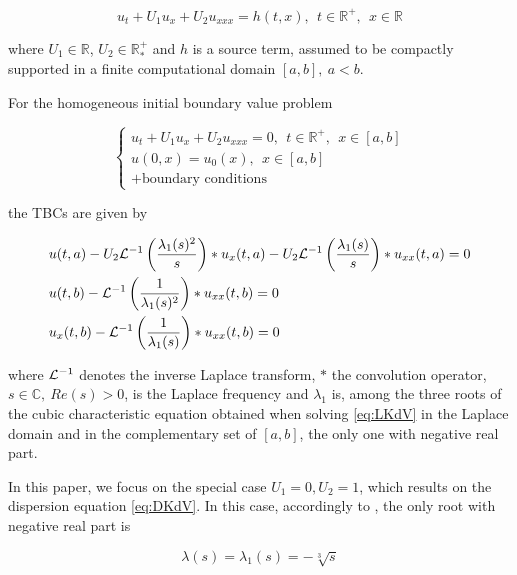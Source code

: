 \begin{equation}
 	\label{eq:LKdV}
 	u_t + U_1u_x + U_2u_{xxx} = h(t,x), \ \ t \in \mathbb{R}^+, \ \ x \in \mathbb{R}
\end{equation}

\noindent where $U_1 \in \mathbb{R}$, $U_2 \in \mathbb{R}^+_*$ and $h$ is a source term, assumed to be compactly supported in a finite computational domain $[a,b], \ a < b$.

\indent For the homogeneous initial boundary value problem 

\begin{equation*}
\begin{cases}
	u_t + U_1u_x + U_2u_{xxx} = 0, \ \ t \in \mathbb{R}^+, \ \ x \in [a,b] \\
	u(0,x) = u_0(x), \ \ x \in [a,b] \\
	+ \text{boundary conditions} \nonumber
\end{cases}
\end{equation*}

\noindent the TBCs are given by \cite[equations (2.17) -(2.18)]{besse2015}

\begin{align}
\label{eq:continuousTBC}
        &u(t,a) - U_2 \mathcal{L}^{-1} \left( \frac{\lambda_1(s)^2}{s} \right) * u_x(t,a) - U_2 \mathcal{L}^{-1} \left( \frac{\lambda_1(s)}{s} \right) * u_{xx}(t,a) = 0 \\ 
        &u(t,b) - \mathcal{L}^{-1} \left( \frac{1}{\lambda_1(s)^2} \right) * u_{xx}(t,b) = 0 \\
        &u_x(t,b) - \mathcal{L}^{-1} \left( \frac{1}{\lambda_1(s)} \right) * u_{xx}(t,b) = 0 
\end{align}

\noindent where $\mathcal{L}^{-1}$ denotes the inverse Laplace transform, $*$ the convolution operator, $s \in \mathbb{C}, \ Re(s)>0$, is the Laplace frequency and $\lambda_1$ is, among the three roots of the cubic characteristic equation obtained when solving \eqref{eq:LKdV} in the Laplace domain and in the complementary set of $[a,b]$, the only one with negative real part.

\indent In this paper, we focus on the special case $U_1 = 0, U_2 = 1$, which results on the dispersion equation \eqref{eq:DKdV}. In this case, accordingly to \cite{zheng2008}, the only root with negative real part is 

\begin{equation}
	\label{eq:lambda}
			\lambda(s) = \lambda_1(s) =  -\sqrt[3]{s} 
\end{equation}

